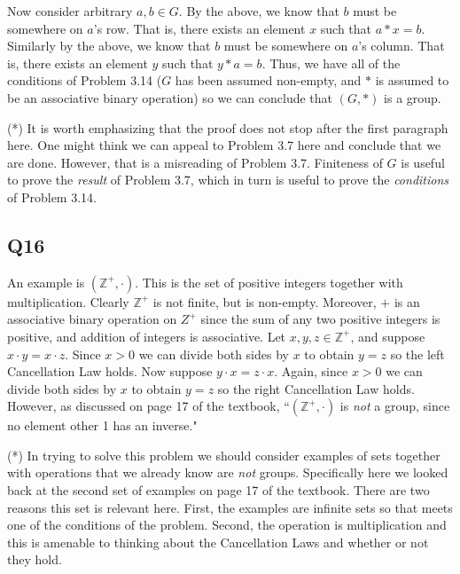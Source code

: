 \documentclass[12pt]{article}
\def\Z{{\mathbb Z}}        %
\numberwithin{theorem}{section}
\numberwithin{equation}{section}
\numberwithin{remark}{section}
\numberwithin{definition}{section}
\numberwithin{theorem}{section}
\numberwithin{lemma}{section}
\numberwithin{example}{section}
\begin{document}
Now consider arbitrary $a,b\in G$. By the above, we know that $b$ must be somewhere on $a$'s row. That is, there exists an element $x$ such that $a*x=b$. Similarly by the above, we know that $b$ must be somewhere on $a$'s column. That is, there exists an element $y$ such that $y*a=b$. Thus, we have all of the conditions of Problem 3.14 ($G$ has been assumed non-empty, and $*$ is assumed to be an associative binary operation) so we can conclude that $(G,*)$ is a group. 

\vspace{\baselineskip}

\noindent (*) It is worth emphasizing that the proof does not stop after the first paragraph here. One might think we can appeal to Problem 3.7 here and conclude that we are done. However, that is a misreading of Problem 3.7. Finiteness of $G$ is useful to prove the \emph{result} of Problem 3.7, which in turn is useful to prove the \emph{conditions} of Problem 3.14.



\subsection{Q16}

An example is $(\Z^{+},\cdot)$. This is the set of positive integers together with multiplication. Clearly $\Z^{+}$ is not finite, but is non-empty. Moreover, $+$ is an associative binary operation on $Z^+$ since the sum of any two positive integers is positive, and addition of integers is associative. Let $x,y,z\in\Z^{+}$, and suppose $x\cdot y = x\cdot z$. Since $x>0$ we can divide both sides by $x$ to obtain $y=z$ so the left Cancellation Law holds. Now suppose $y\cdot x = z\cdot x$. Again, since $x>0$ we can divide both sides by $x$ to obtain $y=z$ so the right Cancellation Law holds. However, as discussed on page 17 of the textbook, ``$(\Z^{+},\cdot)$ is \emph{not} a group, since no element other 1 has an inverse."

\vspace{\baselineskip}

\noindent (*) In trying to solve this problem we should consider examples of sets together with operations that we already know are \emph{not} groups. Specifically here we looked back at the second set of examples on page 17 of the textbook. There are two reasons this set is relevant here. First, the examples are infinite sets so that meets one of the conditions of the problem. Second, the operation is multiplication and this is amenable to thinking about the Cancellation Laws and whether or not they hold. 
\end{document}
